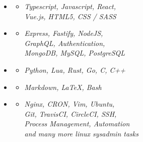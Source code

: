 \documentclass[11pt,oneside,a4paper,titlepage]{article}
\begin{document}
\begin{tcolorbox}
\begin{minipage}[t][25cm]{9cm}
\begin{tcolorbox}[grow to left by=0.55cm,colback=themeBorder,colframe=white,arc=0mm, height=26.275cm]
      \begin{itemize}[leftmargin=0.2cm, label={}]
        \item{
          {}
          \vspace{-0.2cm}
          \begin{itemize}[leftmargin=0.5cm]
            \item{\emph{Typescript, Javascript, React,}\\
              \emph{Vue.js, HTML5, CSS / SASS}}
          \end{itemize}
        }
        \item{
          {}
          \vspace{-0.2cm}
          \begin{itemize}[leftmargin=0.5cm]
            \item{\emph{Express, Fastify, NodeJS,}\\
            \emph{GraphQL, Authentication,}\\
          \emph{MongoDB, MySQL, PostgreSQL}}
          \end{itemize}
          }
        \item{
            {}
            \vspace{-0.2cm}
            \begin{itemize}[leftmargin=0.5cm]
              \item{\emph{Python, Lua, Rust, Go, C, C++}}
            \end{itemize}
          }
        \item{
            {}
            \vspace{-0.2cm}
            \begin{itemize}[leftmargin=0.5cm]
              \item{\emph{Markdown, LaTeX, Bash}}
            \end{itemize}
          }
        \item{
            {}
            \vspace{-0.2cm}
            \begin{itemize}[leftmargin=0.5cm]
              \item{\emph{Nginx, CRON, Vim, Ubuntu,} \\
              \emph{Git, TravisCI, CircleCI, SSH,} \\
              \emph{Process Management, Automation} \\
            \emph{and many more linux sysadmin tasks}}
            \end{itemize}
          }
      \end{itemize}


\end{tcolorbox}
\end{minipage}
\end{tcolorbox}
\end{document}
